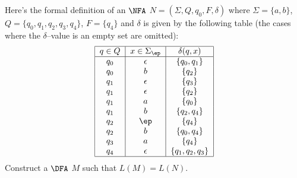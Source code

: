 Here's the formal definition of an $\NFA$ $N = (\Sigma, Q, q_0, F,
\delta)$ where $\Sigma=\{a,b\}$, $Q = \{q_0, q_1, q_2, q_3, q_4\}$,
$F = \{q_4\}$ and $\delta$ is given by the following table
(the cases where the $\delta$--value is an empty set are omitted):
\[
 \begin{tabular}{|c|c|c|}
  \hline
  $q \in Q$ & $x \in \Sigma_\ep$ & $\delta(q,x)$ \\
  \hline
  $q_0$ & $\epsilon$ & $\{q_0, q_1\}$ \\
  $q_0$ & $b$ & $\{q_2\}$ \\
  $q_1$ & $\epsilon$ & $\{q_3\}$ \\
  $q_1$ & $\epsilon$ & $\{q_2\}$ \\
  $q_1$ & $a$ & $\{q_0\}$ \\
  $q_1$ & $b$ & $\{q_2, q_4\}$ \\
  $q_2$ & $\ep$ & $\{q_4\}$ \\
  $q_2$ & $b$ & $\{q_0,q_4\}$ \\
  $q_3$ & $a$ & $\{q_4\}$ \\
  $q_4$ & $\epsilon$ & $\{q_1, q_2, q_3\}$ \\
  \hline
 \end{tabular}
\]
Construct a $\DFA$ $M$ such that $L(M) = L(N)$.
